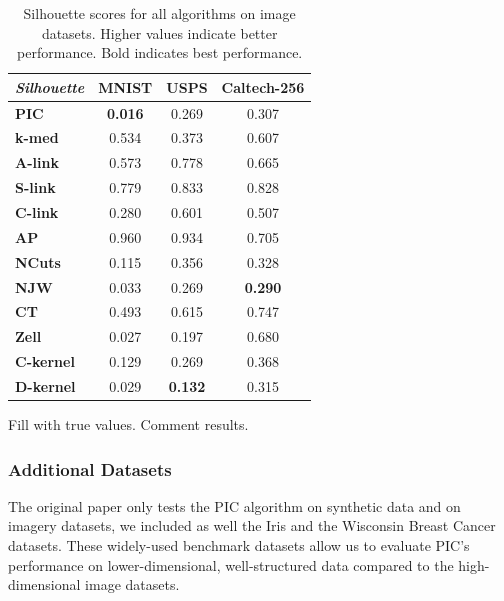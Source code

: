 \begin{table}[h]
    \centering
    \begin{tabular}{|l|c|c|c|}
    \hline
    \textit{Silhouette} & \textbf{MNIST} & \textbf{USPS} & \textbf{Caltech-256} \\
    \hline
    \textbf{PIC}       & \textbf{0.016} & 0.269 & 0.307 \\ \hline
    \textbf{k-med}     & 0.534 & 0.373 & 0.607 \\ \hline
    \textbf{A-link}    & 0.573 & 0.778 & 0.665 \\ \hline
    \textbf{S-link}    & 0.779 & 0.833 & 0.828 \\ \hline
    \textbf{C-link}    & 0.280 & 0.601 & 0.507 \\ \hline
    \textbf{AP}        & 0.960 & 0.934 & 0.705 \\ \hline
    \textbf{NCuts}     & 0.115 & 0.356 & 0.328 \\ \hline
    \textbf{NJW}       & 0.033 & 0.269 & \textbf{0.290} \\ \hline
    \textbf{CT}        & 0.493 & 0.615 & 0.747 \\ \hline
    \textbf{Zell}      & 0.027 & 0.197 & 0.680 \\ \hline
    \textbf{C-kernel}  & 0.129 & 0.269 & 0.368 \\ \hline
    \textbf{D-kernel}  & 0.029 & \textbf{0.132} & 0.315 \\
    \hline
    \end{tabular}
    \caption{Silhouette scores for all algorithms on image datasets. Higher values indicate better performance. Bold indicates best performance.}
    \label{table:silhouette}
\end{table}

Fill with true values. Comment results.

\subsubsection{Additional Datasets}
The original paper only tests the PIC algorithm on synthetic data and on imagery datasets, we included as well the Iris and the Wisconsin Breast Cancer datasets. These widely-used benchmark datasets allow us to evaluate PIC's performance on lower-dimensional, well-structured data compared to the high-dimensional image datasets. 

